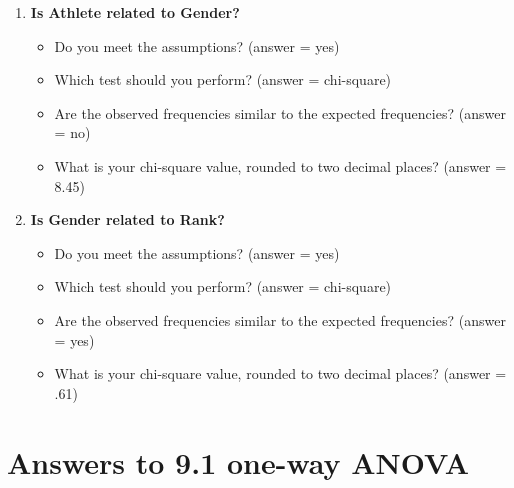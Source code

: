 \documentclass[
]{book}
\begin{document}
\begin{enumerate}
\def\labelenumi{\arabic{enumi}.}
\item
  \textbf{Is Athlete related to Gender?}

  \begin{itemize}
  \item
    Do you meet the assumptions? (answer = yes)
  \item
    Which test should you perform? (answer = chi-square)
  \item
    Are the observed frequencies similar to the expected frequencies? (answer = no)
  \item
    What is your chi-square value, rounded to two decimal places? (answer = 8.45)
  \end{itemize}
\item
  \textbf{Is Gender related to Rank?}

  \begin{itemize}
  \item
    Do you meet the assumptions? (answer = yes)
  \item
    Which test should you perform? (answer = chi-square)
  \item
    Are the observed frequencies similar to the expected frequencies? (answer = yes)
  \item
    What is your chi-square value, rounded to two decimal places? (answer = .61)
  \end{itemize}
\end{enumerate}

\hypertarget{answers-to-9.1-one-way-anova}{%
\section{Answers to 9.1 one-way ANOVA}\label{answers-to-9.1-one-way-anova}}
\end{document}
